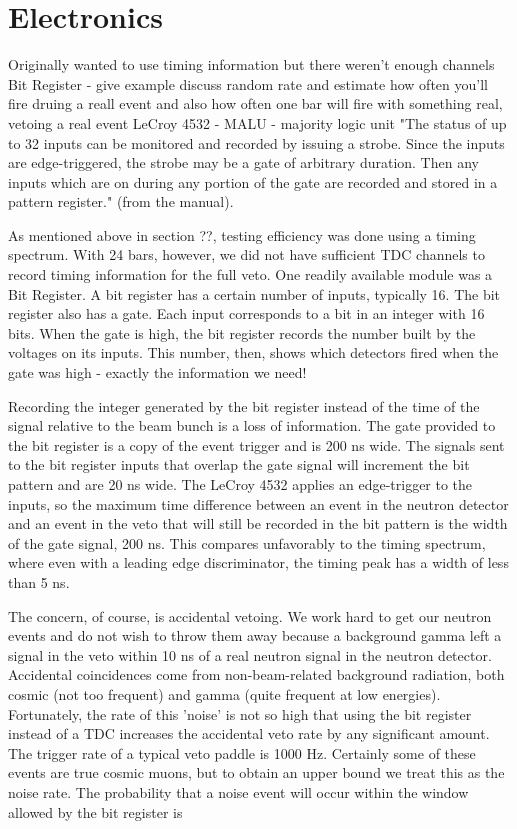 \section{Electronics}
Originally wanted to use timing information but there weren't enough channels
Bit Register - give example
discuss random rate and estimate how often you'll fire druing a reall event and also how often one bar will fire with something real, vetoing a real event
LeCroy 4532 - MALU - majority logic unit "The status of up to 32 inputs can be monitored and recorded by issuing a strobe.  Since the inputs are edge-triggered, the strobe may be a gate of arbitrary duration.  Then any inputs which are on during any portion of the gate are recorded and stored in a pattern register." (from the manual).

As mentioned above in section ??, testing efficiency was done using a timing spectrum.  With 24 bars, however, we did not have sufficient TDC channels to record timing information for the full veto.  One readily available module was a Bit Register.  A bit register has a certain number of inputs, typically 16.  The bit register also has a gate.  Each input corresponds to a bit in an integer with 16 bits.  When the gate is high, the bit register records the number built by the voltages on its inputs.  This number, then, shows which detectors fired when the gate was high - exactly the information we need!

Recording the integer generated by the bit register instead of the time of the signal relative to the beam bunch is a loss of information.  The gate provided to the bit register is a copy of the event trigger and is 200 ns wide.  The signals sent to the bit register inputs that overlap the gate signal will increment the bit pattern and are 20 ns wide.  The LeCroy 4532 applies an edge-trigger to the inputs, so the maximum time difference between an event in the neutron detector and an event in the veto that will still be recorded in the bit pattern is the width of the gate signal, 200 ns.  This compares unfavorably to the timing spectrum, where even with a leading edge discriminator, the timing peak has a width of less than 5 ns.

The concern, of course, is accidental vetoing.  We work hard to get our neutron events and do not wish to throw them away because a background gamma left a signal in the veto within 10 ns of a real neutron signal in the neutron detector.  Accidental coincidences come from non-beam-related background radiation, both cosmic (not too frequent) and gamma (quite frequent at low energies).  Fortunately, the rate of this 'noise' is not so high that using the bit register instead of a TDC increases the accidental veto rate by any significant amount.  The trigger rate of a typical veto paddle is 1000 Hz.  Certainly some of these events are true cosmic muons, but to obtain an upper bound we treat this as the noise rate.  The probability that a noise event will occur within the window allowed by the bit register is 


